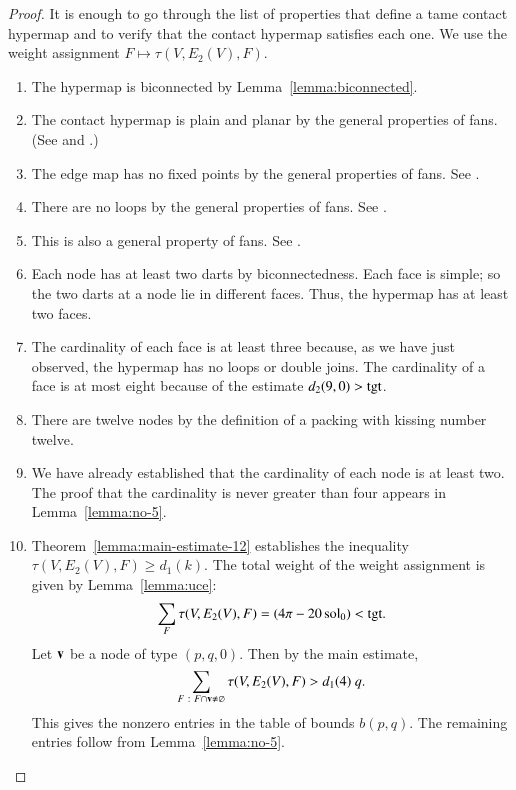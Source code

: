 \documentclass{llncs}
\def\op#1{{\hbox{#1}}}
\begin{document}
\begin{proof} It is enough to go through the list of properties that
  define a tame contact hypermap and to verify that the contact
  hypermap satisfies each one.  We use the weight assignment $F\mapsto
  \tau(V,E_2(V),F)$.

\begin{enumerate}
\item {} The hypermap is biconnected by
  Lemma~\ref{lemma:biconnected}.
\item {} The contact hypermap is plain and planar by the
  general properties of fans.  (See \cite[Lemma~5.8]{DSP} and \cite[5.3]{DSP}.)
\item {} The
  edge map has no fixed points by the general properties of fans.
See \cite[Lemma~5.8]{DSP}.
\item {} 
  There are no loops by the general properties of
  fans. See \cite[Lemma~5.8]{DSP}.
\item {} This is also a general property of fans. See \cite[Lemma~5.8]{DSP}.
\item {} Each node has at least two darts by
  biconnectedness. Each face is simple; so the two darts at a node lie
  in different faces.  Thus, the hypermap has at least two faces.
\item {} The cardinality of each face is at least three
  because, as we have just observed, the hypermap has no loops or double joins.
  The cardinality of a face is at most eight because of the estimate
  $d_2(9,0)>\op{tgt}$.
\item {} There are twelve nodes by the definition of a
  packing with kissing number twelve.
\item {} We have already established that the cardinality
  of each node is at least two.  The proof that the cardinality is
  never  greater than four appears in Lemma~\ref{lemma:no-5}.
\item {} Theorem~\ref{lemma:main-estimate-12} establishes 
 the inequality $\tau(V,E_2(V),F)\ge d_1(k)$.
  The total weight of the weight assignment is given by
  Lemma~\ref{lemma:uce}:
\[
  \sum_F \tau(V,E_2(V),F) = (4\pi - 20\sol_0) < \op{tgt}.
\]
%
Let ${\mathbf v}$ be a node of type $(p,q,0)$.  
Then by the main estimate,
\[
\sum_{F\ :\  F\cap {\mathbf v}\ne\varnothing}\tau(V,E_2(V),F) > d_1(4)~q.
\]
This gives the nonzero entries in the table of bounds $b(p,q)$.  The
remaining entries follow from Lemma~\ref{lemma:no-5}.
\end{enumerate}
\end{proof}
\end{document}
